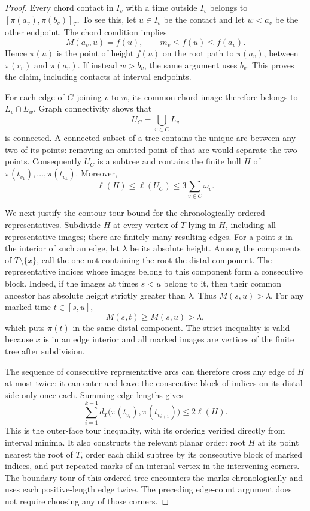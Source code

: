 \begin{proof}
Every chord contact in $I_v$ with a time outside $I_v$ belongs to
$[\pi(a_v),\pi(b_v)]_T$.  To see this, let $u\in I_v$ be the contact
and let $w<a_v$ be the other endpoint.  The chord condition implies
\[
 M(a_v,u)=f(u),\qquad m_v\le f(u)\le f(a_v).
\]
Hence $\pi(u)$ is the point of height $f(u)$ on the root path to
$\pi(a_v)$, between $\pi(r_v)$ and $\pi(a_v)$.  If instead $w>b_v$,
the same argument uses $b_v$.  This proves the claim, including contacts
at interval endpoints.

For each edge of $G$ joining $v$ to $w$, its common chord image therefore
belongs to $L_v\cap L_w$.  Graph connectivity shows that
\[
 U_C=\bigcup_{v\in C}L_v
\]
is connected.  A connected subset of a tree contains the unique arc
between any two of its points: removing an omitted point of that arc
would separate the two points.  Consequently $U_C$ is a subtree and
contains the finite hull $H$ of
$\pi(t_{v_1}),\ldots,\pi(t_{v_k})$.  Moreover,
\begin{equation}\label{arm:connected-box-skeleton-length}
 \ell(H)\le\ell(U_C)\le3\sum_{v\in C}\omega_v.
\end{equation}

We next justify the contour tour bound for the chronologically ordered
representatives.  Subdivide $H$ at every vertex of $T$ lying in $H$,
including all representative images; there are finitely many resulting
edges.  For a point $x$ in the interior of such an edge, let $\lambda$ be
its absolute height.  Among the components of $T\setminus\{x\}$, call the one
not containing the root the distal component.  The representative
indices whose images belong to this component form a consecutive block.
Indeed, if the images at times $s<u$ belong to it, then their common
ancestor has absolute height strictly greater than $\lambda$.
Thus $M(s,u)>\lambda$.  For any marked time $t\in[s,u]$,
\[
 M(s,t)\ge M(s,u)>\lambda,
\]
which puts $\pi(t)$ in the same distal component.  The strict inequality
is valid because $x$ is in an edge interior and all marked images are
vertices of the finite tree after subdivision.

The sequence of consecutive representative arcs can therefore cross any
edge of $H$ at most twice: it can enter and leave the consecutive block
of indices on its distal side only once each.  Summing edge lengths
gives
\begin{equation}\label{arm:chronological-tree-tour}
 \sum_{i=1}^{k-1}
 d_T\bigl(\pi(t_{v_i}),\pi(t_{v_{i+1}})\bigr)
 \le2\ell(H).
\end{equation}
This is the outer-face tour inequality, with its ordering verified
directly from interval minima.  It also constructs the relevant planar
order: root $H$ at its point nearest the root of $T$, order each child
subtree by its consecutive block of marked indices, and put repeated
marks of an internal vertex in the intervening corners.  The boundary
tour of this ordered tree encounters the marks chronologically and uses
each positive-length edge twice.  The preceding edge-count argument
does not require choosing any of those corners.


\end{proof}
